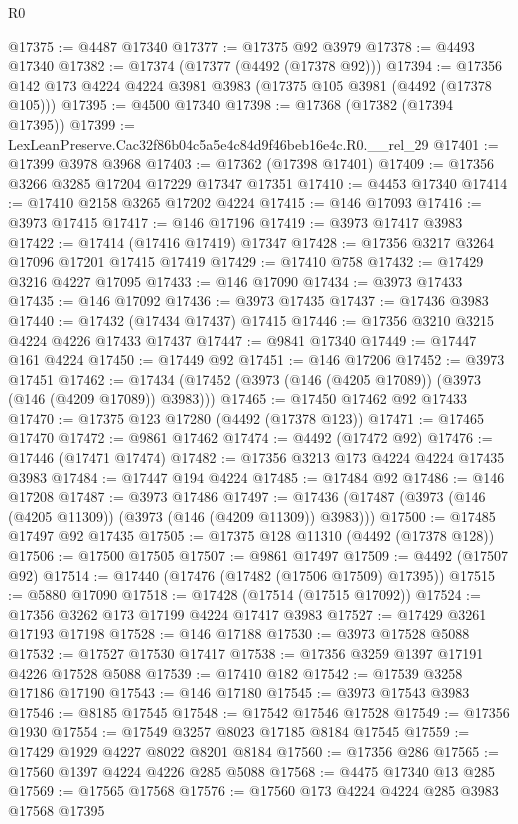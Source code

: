 \begin{lexlean}{R0}
\begin{coremodule}
@17375 := @4487 @17340
@17377 := @17375 @92 @3979
@17378 := @4493 @17340
@17382 := @17374 (@17377 (@4492 (@17378 @92)))
@17394 := @17356 @142 @173 @4224 @4224 @3981 @3983 (@17375 @105 @3981 (@4492 (@17378 @105)))
@17395 := @4500 @17340
@17398 := @17368 (@17382 (@17394 @17395))
@17399 := LexLeanPreserve.Cac32f86b04c5a5e4c84d9f46beb16e4c.R0.__rel_29
@17401 := @17399 @3978 @3968
@17403 := @17362 (@17398 @17401)
@17409 := @17356 @3266 @3285 @17204 @17229 @17347 @17351
@17410 := @4453 @17340
@17414 := @17410 @2158 @3265 @17202 @4224
@17415 := @146 @17093
@17416 := @3973 @17415
@17417 := @146 @17196
@17419 := @3973 @17417 @3983
@17422 := @17414 (@17416 @17419) @17347
@17428 := @17356 @3217 @3264 @17096 @17201 @17415 @17419
@17429 := @17410 @758
@17432 := @17429 @3216 @4227 @17095
@17433 := @146 @17090
@17434 := @3973 @17433
@17435 := @146 @17092
@17436 := @3973 @17435
@17437 := @17436 @3983
@17440 := @17432 (@17434 @17437) @17415
@17446 := @17356 @3210 @3215 @4224 @4226 @17433 @17437
@17447 := @9841 @17340
@17449 := @17447 @161 @4224
@17450 := @17449 @92
@17451 := @146 @17206
@17452 := @3973 @17451
@17462 := @17434 (@17452 (@3973 (@146 (@4205 @17089)) (@3973 (@146 (@4209 @17089)) @3983)))
@17465 := @17450 @17462 @92 @17433
@17470 := @17375 @123 @17280 (@4492 (@17378 @123))
@17471 := @17465 @17470
@17472 := @9861 @17462
@17474 := @4492 (@17472 @92)
@17476 := @17446 (@17471 @17474)
@17482 := @17356 @3213 @173 @4224 @4224 @17435 @3983
@17484 := @17447 @194 @4224
@17485 := @17484 @92
@17486 := @146 @17208
@17487 := @3973 @17486
@17497 := @17436 (@17487 (@3973 (@146 (@4205 @11309)) (@3973 (@146 (@4209 @11309)) @3983)))
@17500 := @17485 @17497 @92 @17435
@17505 := @17375 @128 @11310 (@4492 (@17378 @128))
@17506 := @17500 @17505
@17507 := @9861 @17497
@17509 := @4492 (@17507 @92)
@17514 := @17440 (@17476 (@17482 (@17506 @17509) @17395))
@17515 := @5880 @17090
@17518 := @17428 (@17514 (@17515 @17092))
@17524 := @17356 @3262 @173 @17199 @4224 @17417 @3983
@17527 := @17429 @3261 @17193 @17198
@17528 := @146 @17188
@17530 := @3973 @17528 @5088
@17532 := @17527 @17530 @17417
@17538 := @17356 @3259 @1397 @17191 @4226 @17528 @5088
@17539 := @17410 @182
@17542 := @17539 @3258 @17186 @17190
@17543 := @146 @17180
@17545 := @3973 @17543 @3983
@17546 := @8185 @17545
@17548 := @17542 @17546 @17528
@17549 := @17356 @1930
@17554 := @17549 @3257 @8023 @17185 @8184 @17545
@17559 := @17429 @1929 @4227 @8022 @8201 @8184
@17560 := @17356 @286
@17565 := @17560 @1397 @4224 @4226 @285 @5088
@17568 := @4475 @17340 @13 @285
@17569 := @17565 @17568
@17576 := @17560 @173 @4224 @4224 @285 @3983 @17568 @17395

\end{coremodule}
\end{lexlean}
